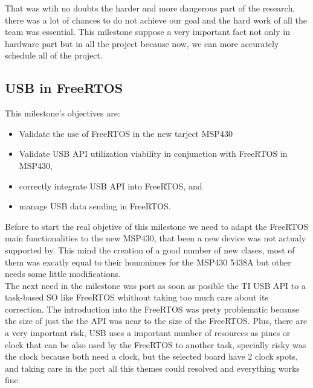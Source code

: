 		That was wtih no doubts the harder and more dangerous part of the research, there was a lot of chances to do not achieve our goal and the hard work of all the team was essential. This milestone suppose a very important fact not only in hardware part but in all the project because now, we can more accurately schedule all of the project. \\


		\subsection{USB in FreeRTOS}
		\label{ssec:USB.FreeRTOS}	
		This milestone's objectives are:
		\begin{itemize}
		\item Validate the use of FreeRTOS in the new tarject MSP430
		\item Validate USB API utilization viability in conjunction with FreeRTOS in MSP430,
		\item correctly integrate USB API into FreeRTOS, and
		\item manage USB data sending in FreeRTOS.
		\end{itemize}

		Before to start the real objetive of this milestone we need to adapt the FreeRTOS main functionalities to the new MSP430, that been a new device was not actualy supported by. This mind the creation of a good number of new clases, most of them was excatly equal to their homonimes for the MSP430 5438A but other needs some little modifications.\\

		The next need in the milestone was port as soon as posible the TI USB API to a task-based SO like FreeRTOS whithout taking too much care about its correction. The introduction into the FreeRTOS was prety problematic because the size of just the the API was near to the size of the FreeRTOS. Plus, there are a very important risk, USB uses a important number of resources as pines or clock that can be also used by the FreeRTOS to another task, specially risky was the clock because both need a clock, but the selected board have 2 clock spots, and taking care in the port all this themes could resolved and everything works fine.\\


